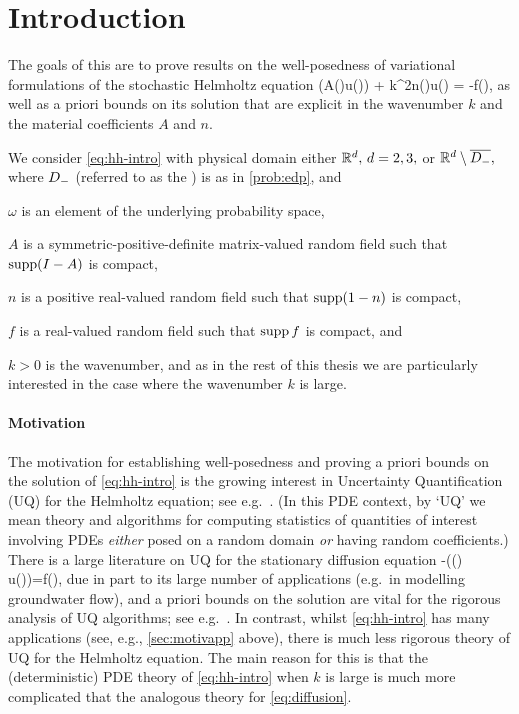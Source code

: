 \section{Introduction}\label{sec:intro}
The goals of this  are to prove results on the well-posedness of variational formulations of the stochastic Helmholtz equation
\beq\label{eq:hh-intro}
\grad\cdot\mleft(A(\omega)\grad u(\omega)\mright) + k^2n(\omega)u(\omega) = -f(\omega),
\eeq
as well as a priori bounds on its solution that are explicit in the wavenumber $k$ and the material coefficients $A$ and $n.$


We consider \eqref{eq:hh-intro} with physical domain either $\mathbb R^{d}, \, d=2,3,$ or $\mathbb R^d\setminus\overline{D_{-}},$ where $D_{-}$ (referred to as the ) is as in \cref{prob:edp}, and

\bit
\item $\omega$ is an element of the underlying probability space,
\item $A$ is a symmetric-positive-definite matrix-valued random field such that $\operatorname{supp}(I-A)$ is compact,
\item $n$ is a positive real-valued random field such that $\operatorname{supp}(1-n)$ is compact,
\item $f$ is a real-valued random field such that $\operatorname{supp} f$ is compact, and
  \item $k>0$ is the wavenumber,
  \eit
and as in the rest of this thesis we are particularly interested in the case where the wavenumber $k$ is large.

\paragraph{Motivation} The motivation for establishing well-posedness and proving a priori bounds on the solution of \eqref{eq:hh-intro} is the growing interest in Uncertainty Quantification (UQ) for the Helmholtz equation; see e.g.~\cite{XiSh:07,TsXiYi:11,BuGh:14,GaHa:15,FeLiLo:15,FeLiNi:18,LiWaZh:18,HiScScSc:15,BaCaHaZh:18}. (In this PDE context, by `UQ' we mean theory and algorithms for computing statistics of quantities of interest involving PDEs \emph{either} posed on a random domain \emph{or} having random coefficients.) There is a large literature on UQ for the stationary diffusion equation
\beq\label{eq:diffusion}
-\grad\cdot (\kappa(\omega) \grad u(\omega))=f(\omega),
\eeq
due in part to its large number of applications (e.g.~in modelling groundwater flow), and a priori bounds on the solution are vital for the rigorous analysis of UQ algorithms; see e.g.~\cite{BaTeZo:04,BaNoTe:07,Gi:10,MuSt:11,ChScTe:13}. In contrast, whilst \eqref{eq:hh-intro} has many applications (see, e.g., \cref{sec:motivapp} above), there is much less rigorous theory of UQ for the Helmholtz equation. The main reason for this is that the (deterministic) PDE theory of \eqref{eq:hh-intro} when $k$ is large is much more complicated that the analogous theory for \eqref{eq:diffusion}.
 
